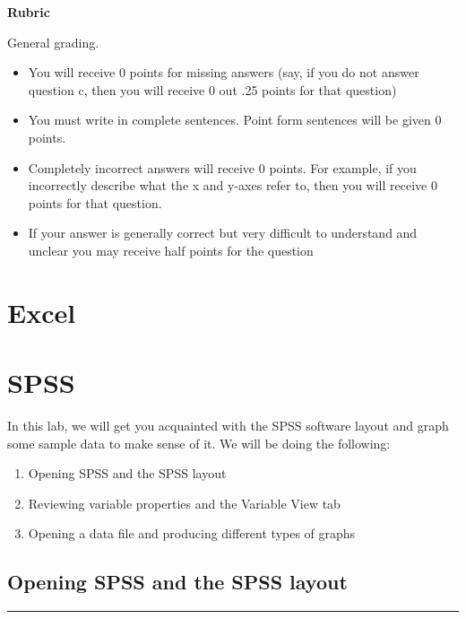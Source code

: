 \documentclass[
]{book}
\providecommand{\tightlist}{%
  \setlength{\itemsep}{0pt}\setlength{\parskip}{0pt}}
\begin{document}
\textbf{Rubric}

General grading.

\begin{itemize}
\tightlist
\item
  You will receive 0 points for missing answers (say, if you do not answer question c, then you will receive 0 out .25 points for that question)
\item
  You must write in complete sentences. Point form sentences will be given 0 points.
\item
  Completely incorrect answers will receive 0 points. For example, if you incorrectly describe what the x and y-axes refer to, then you will receive 0 points for that question.
\item
  If your answer is generally correct but very difficult to understand and unclear you may receive half points for the question
\end{itemize}

\hypertarget{excel-1}{%
\section{Excel}\label{excel-1}}

\hypertarget{spss-1}{%
\section{SPSS}\label{spss-1}}

In this lab, we will get you acquainted with the SPSS software layout and graph some sample data to make sense of it. We will be doing the following:

\begin{enumerate}
\def\labelenumi{\arabic{enumi}.}
\tightlist
\item
  Opening SPSS and the SPSS layout
\item
  Reviewing variable properties and the Variable View tab
\item
  Opening a data file and producing different types of graphs
\end{enumerate}

\hypertarget{opening-spss-and-the-spss-layout}{%
\subsection{Opening SPSS and the SPSS layout}\label{opening-spss-and-the-spss-layout}}

\begin{center}\rule{0.5\linewidth}{0.5pt}\end{center}
\end{document}
